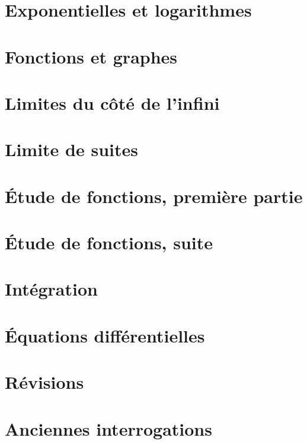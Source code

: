 \section{Exponentielles et logarithmes}


\section{Fonctions et graphes}


\section{Limites du côté de l'infini}

\section{Limite de suites}


\section{Étude de fonctions, première partie}

\section{Étude de fonctions, suite}

\section{Intégration}


\section{Équations différentielles}


\section{Révisions}


\section{Anciennes interrogations}

